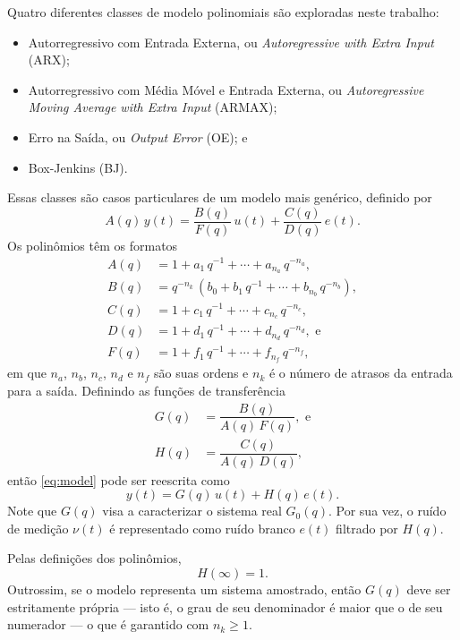 \documentclass{ppgeesa}
\newcommand{\Prod}{\,}
\begin{document}
Quatro diferentes classes de modelo polinomiais são exploradas neste trabalho:
\begin{itemize}
  \item Autorregressivo com Entrada Externa, ou \emph{Autoregressive with Extra Input} (ARX);
  \item Autorregressivo com Média Móvel e Entrada Externa, ou \emph{Autoregressive Moving Average with Extra Input} (ARMAX);
  \item Erro na Saída, ou \emph{Output Error} (OE); e
  \item Box-Jenkins (BJ).
\end{itemize}
Essas classes são casos particulares de um modelo mais genérico, definido por
\begin{equation}\label{eq:model}
  A(q) \Prod y(t) = \dfrac{B(q)}{F(q)} \Prod u(t) + \dfrac{C(q)}{D(q)} \Prod e(t)
  .
\end{equation}
Os polinômios têm os formatos
\begin{align}
  A(q) &= 1 + a_1 \Prod q^{-1} + \dotsb + a_{n_a} \Prod q^{-n_a}
  ,
  \\
  B(q) &= q^{-n_k} \Prod \left(b_0 + b_1 \Prod q^{-1} + \dotsb + b_{n_b} \Prod q^{-n_b}\right)
  ,
  \\
  C(q) &= 1 + c_1 \Prod q^{-1} + \dotsb + c_{n_c} \Prod q^{-n_c}
  ,
  \\
  D(q) &= 1 + d_1 \Prod q^{-1} + \dotsb + d_{n_d} \Prod q^{-n_d}
  , \text{ e}
  \\
  F(q) &= 1 + f_1 \Prod q^{-1} + \dotsb + f_{n_f} \Prod q^{-n_f}
  ,
\end{align}
em que $n_a$, $n_b$, $n_c$, $n_d$ e $n_f$ são suas ordens e $n_k$ é o número de atrasos da entrada para a saída.
Definindo as funções de transferência
\begin{align}
  G(q) &= \dfrac{B(q)}{A(q) \Prod F(q)}
  , \text{ e}
  \\
  H(q) &= \dfrac{C(q)}{A(q) \Prod D(q)}
  ,
\end{align}
então \eqref{eq:model} pode ser reescrita como
\begin{equation}\label{eq:model-tf}
  y(t) = G(q) \Prod u(t) + H(q) \Prod e(t)
  .
\end{equation}
Note que $G(q)$ visa a caracterizar o sistema real $G_0(q)$.
Por sua vez, o ruído de medição $\nu(t)$ é representado como ruído branco $e(t)$ filtrado por $H(q)$.

Pelas definições dos polinômios,
\begin{equation}\label{eq:H-inf}
  H(\infty) = 1
  .
\end{equation}
Outrossim, se o modelo representa um sistema amostrado, então $G(q)$ deve ser estritamente própria --- isto é, o grau de seu denominador é maior que o de seu numerador --- o que é garantido com $n_k \geq 1$.
\end{document}
